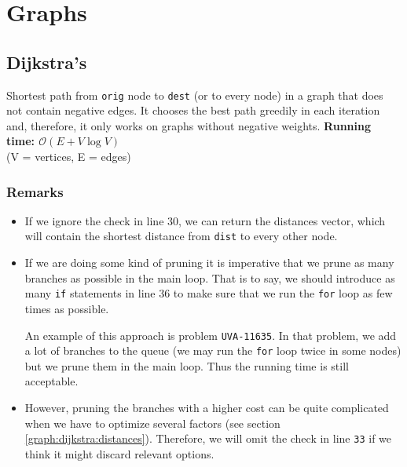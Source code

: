 \chapter{Graphs}

\section{Dijkstra's}
Shortest path from \texttt{orig} node to \texttt{dest} (or to every node) in a graph
that does not contain negative edges. 
It chooses the best path greedily in each iteration and, therefore, it only works
on graphs without negative weights. 
\noindent \textbf{\boldmath Running time: $\mathcal{O}(E+V\log V)$}
\\ {\small(V = vertices, E = edges)}
\subsection*{Remarks}
\begin{itemize}
	\item If we ignore the check in line 30, we can return the distances 
		vector, which will contain the shortest distance from \texttt{dist}
		to every other node.
	\item If we are doing some kind of pruning it is imperative that we prune 
	as many branches as possible in the main loop. That is to say, we should
	introduce as many \texttt{if} statements in line 36 to make sure that we
	run the \texttt{for} loop as few times as possible. 

	An example of this approach is problem \texttt{UVA-11635}. In that problem, we
	add a lot of branches to the queue (we may run the \texttt{for} loop
	twice in some nodes) but we prune them in the main loop. Thus the 
	running time is still acceptable.

\item  However, pruning the branches with a higher cost can be quite complicated 
	when we have to optimize several factors (see section \ref{graph:dijkstra:distances}).
	Therefore, we will omit the check in line \texttt{33} if we think it might discard 
	relevant options.

\end{itemize}

\newpage
